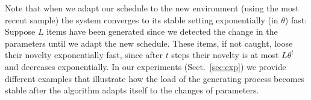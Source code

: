 
Note that when we adapt our schedule to the new environment (using the most
recent sample) the system converges to its stable setting exponentially (in
$\theta$) fast: Suppose $L$ items have been generated since we detected the
change in the parameters until we adapt the new schedule. These items, if not
caught, loose their novelty exponentially fast, since after $t$ steps their
novelty is at most $L\theta^t$ and decreases exponentially. In our experiments
(Sect.~\ref{sec:exp}) we provide different examples that illustrate how the load
of the generating process becomes stable after the algorithm adapts itself to
the changes of parameters.

%
%
%
%
%
%
%

